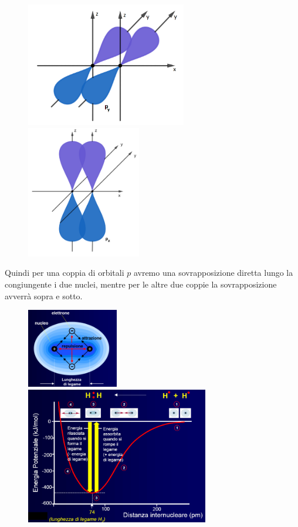 \begin{figure}[ht]
    {
      \includegraphics[width=7cm]{immagini/orbitali_py.png}
    }
    \hfill
    {
      \includegraphics[width=5cm]{immagini/orbitali_pz.png}
    }
  \end{figure}

Quindi per una coppia di orbitali $p$ avremo una sovrapposizione diretta lungo la congiungente i due nuclei, mentre per le altre due coppie la sovrapposizione avverrà sopra e sotto.

\begin{figure}[!tbp]
    \centering
    {\includegraphics[width=4cm]{immagini/forze_legame_covalente.png}\label{fig:f5}}
    \hfill
    {\includegraphics[width=8cm]{immagini/legame_covalente_H_2.png}\label{fig:f6}}
\end{figure}

